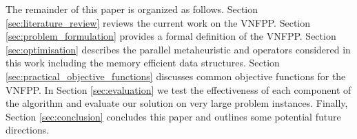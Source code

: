 The remainder of this paper is organized as follows. Section \ref{sec:literature_review} reviews the current work on the VNFPP. Section \ref{sec:problem_formulation} provides a formal definition of the VNFPP. Section \ref{sec:optimisation} describes the parallel metaheuristic and operators considered in this work including the memory efficient data structures. Section \ref{sec:practical_objective_functions} discusses common objective functions for the VNFPP. In Section \ref{sec:evaluation} we test the effectiveness of each component of the algorithm and evaluate our solution on very large problem instances. Finally, Section \ref{sec:conclusion} concludes this paper and outlines some potential future directions.
